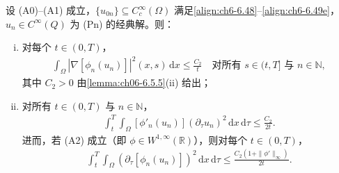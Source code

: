 \documentclass[../../main.tex]{subfiles}%
\begin{document}
\begin{lemma}[$t>0$ 上的梯度与时间导数估计]\label{lemma:ch06-6.5.7}
设 (A0)--(A1) 成立，$\{u_{0n}\}\subseteq C^\infty_c(\Omega)$ 满足\eqref{align:ch6-6.48}--\eqref{align:ch6-6.49e}，$u_n\in C^\infty(Q)$ 为 (Pn) 的经典解。则：
\begin{enumerate}[(i)]
\item 对每个 $t\in(0,T)$，
\begin{align}
\int_\Omega|\nabla[\phi_n(u_n)]|^2(x,s)\,\mathrm{d}x\leqslant\frac{C_2}{t}
\quad\text{对所有 }s\in(t,T]\text{ 与 }n\in\mathbb{N}, \label{align:ch6-6.69}
\end{align}
其中 $C_2>0$ 由\cref{lemma:ch06-6.5.5}(ii) 给出；
\item 对所有 $t\in(0,T)$ 与 $n\in\mathbb{N}$，
\begin{align}
\int_t^T\int_\Omega[\phi'_n(u_n)](\partial_\tau u_n)^2\,\mathrm{d}x\,\mathrm{d}\tau
\leqslant\frac{C_2}{2t}. \label{align:ch6-6.70a}
\end{align}
进而，若 (A2) 成立（即 $\phi\in W^{1,\infty}(\mathbb{R})$），则对每个 $t\in(0,T)$，
\begin{align}
\int_t^T\int_\Omega(\partial_\tau[\phi_n(u_n)])^2\,\mathrm{d}x\,\mathrm{d}\tau
\leqslant\frac{C_2(1+\|\phi'\|_\infty)}{2t}. \label{align:ch6-6.70b}
\end{align}
\end{enumerate}
\end{lemma}
\end{document}
